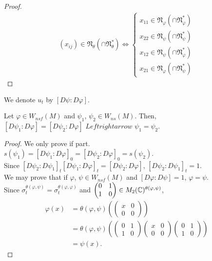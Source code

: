\begin{proof}
  \begin{align*}
    (x_{ij}) \in \mathfrak{N}_\theta (\cap \mathfrak{N}_\theta^*) \Leftrightarrow \left\{ \begin{array}{ll} x_{11} \in \mathfrak{N}_\varphi (\cap \mathfrak{N}_\varphi^*)\\
      x_{22} \in \mathfrak{N}_\psi (\cap \mathfrak{N}_\psi^*)\\
      x_{12} \in \mathfrak{N}_\psi (\cap \mathfrak{N}_\varphi^*)\\
      x_{21} \in \mathfrak{N}_\varphi (\cap \mathfrak{N}_\psi^*)
    \end{array} \right.
  \end{align*}
\end{proof}
We denote $u_t$ by $[D\psi:D\varphi]$.

\begin{corollary}
  Let $\varphi \in W_{nsf}(M)$ and $\psi_1$, $\psi_2 \in W_{ns}(M)$. Then, \\
  $[D\psi_1:D\varphi] = [D\psi_2:D\varphi]$ $Leftrightarrow$ $\psi_1 = \psi_2$.
\end{corollary}

\begin{proof}
  We only prove if part.\\
  $s(\psi_1) = [D\psi_1:D\varphi]_0 = [D\psi_2:D\varphi]_0 = s(\psi_2)$. \\
  Since $[D\psi_2:D\psi_1]_t[D\psi_1:D\varphi]_t=[D\psi_2:D\varphi]$, $[D\psi_2:D\psi_1]_t=1$.\\
  We may prove that if $\varphi$, $\psi \in W_{nsf}(M)$ and $[D\varphi:D\psi]=1$, $\varphi=\psi$.\\
  Since $\sigma_t^{\theta(\varphi,\psi)} = \sigma_t^{\theta(\varphi,\varphi)}$ and $\begin{pmatrix} 0 & 1 \\ 1 & 0 \end{pmatrix} \in M_2(\mathbb{C})^{\theta(\varphi,\psi)}$, \\
  \begin{align*}
    \varphi(x)
    &= \theta(\varphi,\psi)(\begin{pmatrix} x & 0 \\ 0 & 0 \end{pmatrix})\\
    &= \theta(\varphi,\psi)(\begin{pmatrix} 0 & 1 \\ 1 & 0 \end{pmatrix}\begin{pmatrix} x & 0 \\ 0 & 0 \end{pmatrix} \begin{pmatrix} 0 & 1 \\ 1 & 0 \end{pmatrix})\\
    &= \psi(x).
  \end{align*}
\end{proof}

